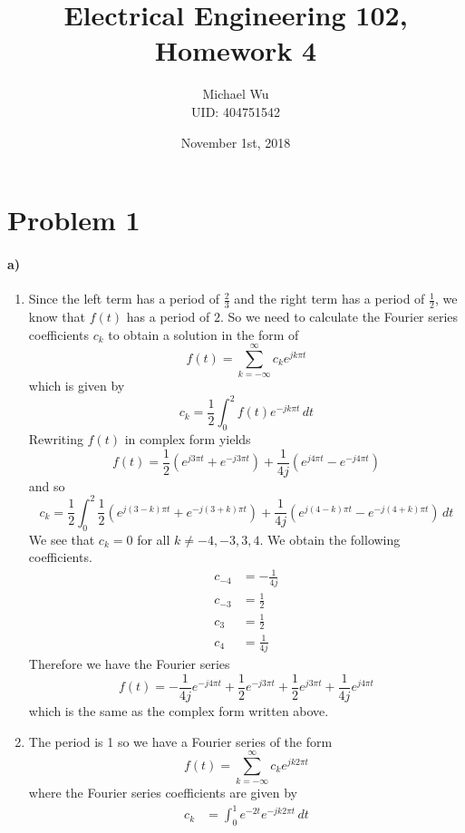 \documentclass[12pt]{article}
\begin{document}
\title{Electrical Engineering 102, Homework 4}
\date{November 1st, 2018}
\author{Michael Wu\\UID: 404751542}
\maketitle

\section*{Problem 1}

\paragraph{a)}

\begin{enumerate}
    \item Since the left term has a period of \(\frac{2}{3}\) and the right term has a period of \(\frac{1}{2}\), we know that \(f(t)\) has a period of \(2\).
    So we need to calculate the Fourier series coefficients \(c_k\) to obtain a solution in the form of
    \[f(t)=\sum_{k=-\infty}^\infty c_k e^{jk\pi t}\]
    which is given by
    \[c_k=\frac{1}{2}\int_0^2 f(t)e^{-jk\pi t}\,dt\]
    Rewriting \(f(t)\) in complex form yields
    \[f(t)=\frac{1}{2}\left(e^{j3\pi t}+e^{-j3\pi t}\right) + \frac{1}{4j}\left(e^{j4\pi t}-e^{-j4\pi t}\right)\]
    and so
    \[c_k=\frac{1}{2}\int_0^2 \frac{1}{2}\left(e^{j(3-k)\pi t}+e^{-j(3+k)\pi t}\right) + \frac{1}{4j}\left(e^{j(4-k)\pi t}-e^{-j(4+k)\pi t}\right)\,dt\]
    We see that \(c_k=0\) for all \(k\neq -4,-3,3,4\). We obtain the following coefficients.
    \begin{align*}
        c_{-4}&=-\frac{1}{4j}\\
        c_{-3}&=\frac{1}{2}\\
        c_3&=\frac{1}{2}\\
        c_4&=\frac{1}{4j}
    \end{align*}
    Therefore we have the Fourier series
    \[f(t)=-\frac{1}{4j}e^{-j4\pi t}+\frac{1}{2}e^{-j3\pi t}+\frac{1}{2}e^{j3\pi t}+\frac{1}{4j}e^{j4\pi t}\]
    which is the same as the complex form written above.
    \item The period is 1 so we have a Fourier series of the form
    \[f(t)=\sum_{k=-\infty}^\infty c_k e^{jk2\pi t}\]
    where the Fourier series coefficients are given by
    \begin{align*}
        c_k &= \int_0^1 e^{-2t} e^{-jk2\pi t}\, dt\\

\end{align*}
\end{enumerate}
\end{document}
